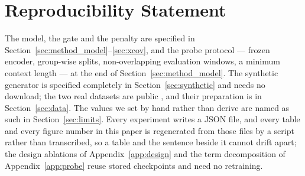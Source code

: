 \section*{Reproducibility Statement}

The model, the gate and the penalty are specified in Section~\ref{sec:method_model}--\ref{sec:xcov}, and the probe protocol --- frozen encoder, group-wise splits, non-overlapping evaluation windows, a minimum context length --- at the end of Section~\ref{sec:method_model}. The synthetic generator is specified completely in Section~\ref{sec:synthetic} and needs no download; the two real datasets are public \citep{wagner2020, reyesortiz2016, hapt2015}, and their preparation is in Section~\ref{sec:data}. The values we set by hand rather than derive are named as such in Section~\ref{sec:limits}. Every experiment writes a JSON file, and every table and every figure number in this paper is regenerated from those files by a script rather than transcribed, so a table and the sentence beside it cannot drift apart; the design ablations of Appendix~\ref{app:design} and the term decomposition of Appendix~\ref{app:probe} reuse stored checkpoints and need no retraining.
